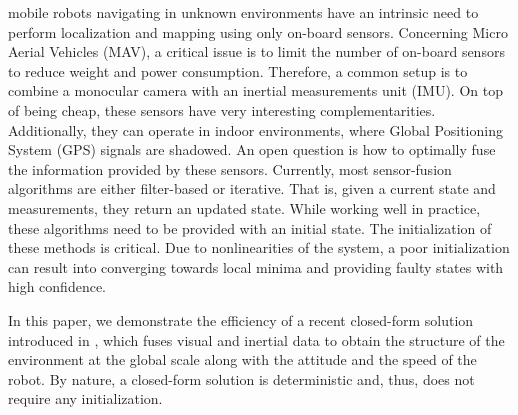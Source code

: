 \documentclass[letterpaper, 10 pt, journal, twoside]{IEEEtran}  %
\begin{document}
 mobile robots navigating in unknown environments have an intrinsic need to perform localization and mapping using only on-board sensors.
Concerning Micro Aerial Vehicles (MAV), a critical issue is to limit the number of on-board sensors to reduce weight and power consumption.
Therefore, a common setup is to combine a monocular camera with an inertial measurements unit (IMU).
On top of being cheap, these sensors have very interesting complementarities.
Additionally, they can operate in indoor environments, where Global Positioning System (GPS) signals are shadowed.
An open question is how to optimally fuse the information provided by these sensors.
Currently, most sensor-fusion algorithms are either filter-based or iterative. That is, given a current state and measurements, they return an updated state.
While working well in practice, these algorithms need to be provided with an initial state.
The initialization of these methods is critical.
Due to nonlinearities of the system, a poor initialization can result into converging towards local minima and  providing faulty states with high confidence.

In this paper, we demonstrate the efficiency of a recent closed-form solution introduced in \cite{Martinelli2012, Martinelli2014}, which fuses visual and inertial data to obtain the structure of the environment at the global scale along with the attitude and the speed of the robot.
By nature, a closed-form solution is deterministic and, thus, does not require any initialization.

\end{document}

